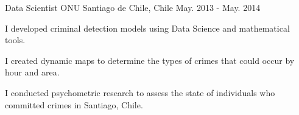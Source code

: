 \begin{cventries}
  \cventry
    {Data Scientist} %
    {ONU} %
    {Santiago de Chile, Chile} %
    {May. 2013 - May. 2014} %
    {
      \begin{cvitems} %
        \item {I developed criminal detection models using Data Science and mathematical tools.}
        \item {I created dynamic maps to determine the types of crimes that could occur by hour and area.}
        \item {I conducted psychometric research to assess the state of individuals who committed crimes in Santiago, Chile.}
      \end{cvitems}
    }

\end{cventries}
